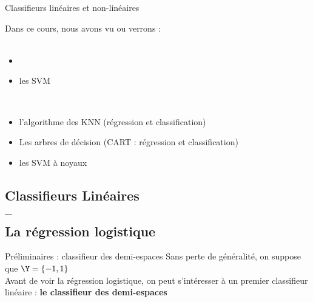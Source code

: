 \documentclass[10pt]{beamer}
\begin{document}
\begin{frame}{Classifieurs linéaires et non-linéaires}
	
	Dans ce cours, nous avons vu ou verrons :\\[2em]
	
	 \\
	\begin{itemize}
		\item {}
		\item les SVM
	\end{itemize}
	
	\vspace*{3em}
	
		 \\
	\begin{itemize}
		\item l'algorithme des KNN (régression et classification)
		\item Les arbres de décision (CART : régression et classification)
		\item les SVM à noyaux
	\end{itemize}
	\vspace*{3em}
	
\end{frame}




\subsection{Classifieurs Linéaires\\[0.5em] --\\[0.5em]  La régression logistique}

\begin{frame}{Préliminaires : classifieur des demi-espaces}
	\vspace*{-0.5em}
	Sans perte de généralité, on suppose que $\Y = \{-1,1\}$\\[1em]
	
	Avant de voir  la régression logistique, on peut s'intéresser à un premier classifieur linéaire : \textbf{le classifieur des demi-espaces}
	\vspace*{25em}
\end{frame}
\end{document}
